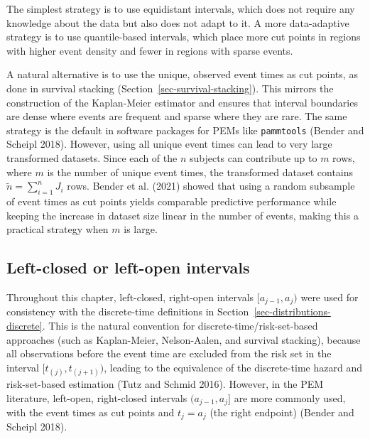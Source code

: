 \documentclass[
  letterpaper,
  krantz2]{style/krantz}
\begin{document}
The simplest strategy is to use equidistant intervals, which does not
require any knowledge about the data but also does not adapt to it. A
more data-adaptive strategy is to use quantile-based intervals, which
place more cut points in regions with higher event density and fewer in
regions with sparse events.

A natural alternative is to use the unique, observed event times as cut
points, as done in survival stacking
(Section~\ref{sec-survival-stacking}). This mirrors the construction of
the Kaplan-Meier estimator and ensures that interval boundaries are
dense where events are frequent and sparse where they are rare. The same
strategy is the default in software packages for PEMs like
\texttt{pammtools} (Bender and Scheipl 2018). However, using all unique
event times can lead to very large transformed datasets. Since each of
the \(n\) subjects can contribute up to \(m\) rows, where \(m\) is the
number of unique event times, the transformed dataset contains
\(\tilde{n} = \sum_{i=1}^n J_i\) rows. Bender et al. (2021) showed that
using a random subsample of event times as cut points yields comparable
predictive performance while keeping the increase in dataset size linear
in the number of events, making this a practical strategy when \(m\) is
large.

\subsection{Left-closed or left-open
intervals}\label{sec-left-closed-vs-left-open}

Throughout this chapter, left-closed, right-open intervals
\([a_{j-1}, a_j)\) were used for consistency with the discrete-time
definitions in Section~\ref{sec-distributions-discrete}. This is the
natural convention for discrete-time/risk-set-based approaches (such as
Kaplan-Meier, Nelson-Aalen, and survival stacking), because all
observations before the event time are excluded from the risk set in the
interval \([t_{(j)}, t_{(j+1)})\), leading to the equivalence of the
discrete-time hazard and risk-set-based estimation (Tutz and Schmid
2016). However, in the PEM literature, left-open, right-closed intervals
\((a_{j-1}, a_j]\) are more commonly used, with the event times as cut
points and \(t_j = a_j\) (the right endpoint) (Bender and Scheipl 2018).
\end{document}
